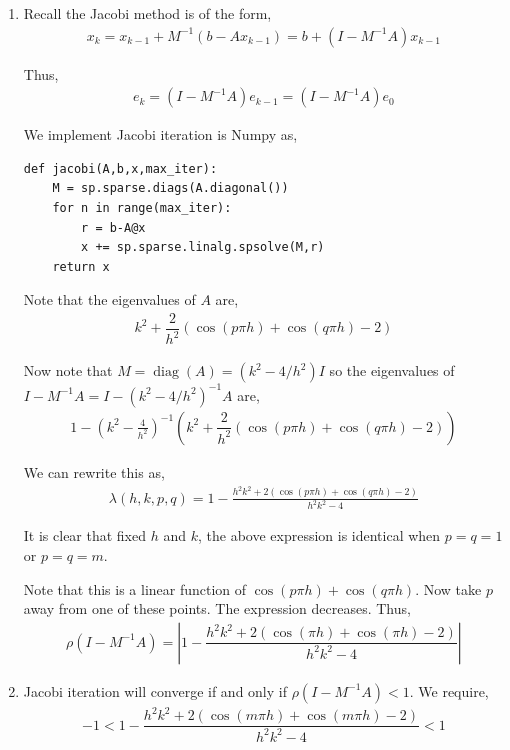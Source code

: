 \documentclass[10pt]{article}
\begin{document}
\begin{solution}[Solution]
\begin{enumerate}[label=(\alph*)]
\item
Recall the Jacobi method is of the form,
\begin{align*}
    x_k = x_{k-1} + M^{-1} (b-Ax_{k-1}) = b+(I-M^{-1}A)x_{k-1}
\end{align*}

Thus,
\begin{align*}
    e_k = (I-M^{-1}A)e_{k-1} = (I-M^{-1}A)e_0
\end{align*}

We implement Jacobi iteration is Numpy as,
\begin{lstlisting}
def jacobi(A,b,x,max_iter):
    M = sp.sparse.diags(A.diagonal())
    for n in range(max_iter):
        r = b-A@x
        x += sp.sparse.linalg.spsolve(M,r)
    return x
\end{lstlisting}

Note that the eigenvalues of \( A \) are,
\begin{align*}
    k^2 + \dfrac{2}{h^2}(\cos(p\pi h)+\cos(q\pi h)-2)
\end{align*}



Now note that \( M = \operatorname{diag}(A) = (k^2 - 4/h^2) I \) so the eigenvalues of \( I - M^{-1}A = I - (k^2 - 4/h^2)^{-1} A \) are,
\begin{align*}
    1 - \left( k^2 - \frac{4}{h^2} \right)^{-1}\left( k^2 + \dfrac{2}{h^2}(\cos(p\pi h)+\cos(q\pi h)-2) \right)
\end{align*}

We can rewrite this as,
\begin{align*}
    \lambda(h,k,p,q) = 1 - \frac{ h^2k^2 + 2(\cos(p\pi h)+\cos(q\pi h)-2)}{h^2k^2 - 4}
\end{align*}

It is clear that fixed \( h \) and \( k \), the above expression is identical when \( p=q=1 \) or \( p=q=m \).

Note that this is a linear function of \( \cos(p\pi h) + \cos(q\pi h) \).
Now take \( p \) away from one of these points. The expression decreases.
Thus,
\begin{align*}
    \rho(I-M^{-1}A) = \left| 1 - \dfrac{h^2k^2 + 2(\cos(\pi h)+\cos(\pi h)-2) }{h^2k^2-4} \right|
\end{align*}


\item
Jacobi iteration will converge if and only if \( \rho(I-M^{-1}A) < 1 \). We require,
\begin{align*}
    -1 < 1 - \dfrac{h^2k^2 + 2(\cos(m\pi h)+\cos(m\pi h)-2) }{h^2k^2-4} < 1
\end{align*}


\end{enumerate}
\end{solution}
\end{document}
